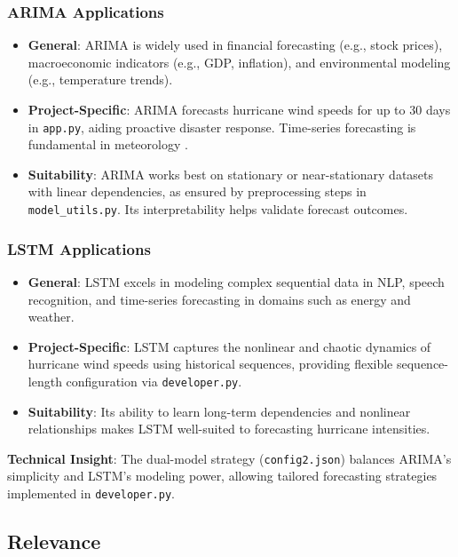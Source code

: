 \subsubsection{ARIMA Applications}

\begin{itemize}
	\item \textbf{General}: ARIMA is widely used in financial forecasting (e.g., stock prices), macroeconomic indicators (e.g., GDP, inflation), and environmental modeling (e.g., temperature trends).
	\item \textbf{Project-Specific}: ARIMA forecasts hurricane wind speeds for up to 30 days in \texttt{app.py}, aiding proactive disaster response. Time-series forecasting is fundamental in meteorology \cite{Emanuel2005}.
	\item \textbf{Suitability}: ARIMA works best on stationary or near-stationary datasets with linear dependencies, as ensured by preprocessing steps in \texttt{model\_utils.py}. Its interpretability helps validate forecast outcomes.
\end{itemize}

\subsubsection{LSTM Applications}

\begin{itemize}
	\item \textbf{General}: LSTM excels in modeling complex sequential data in NLP, speech recognition, and time-series forecasting in domains such as energy and weather.
	\item \textbf{Project-Specific}: LSTM captures the nonlinear and chaotic dynamics of hurricane wind speeds using historical sequences, providing flexible sequence-length configuration via \texttt{developer.py}.
	\item \textbf{Suitability}: Its ability to learn long-term dependencies and nonlinear relationships makes LSTM well-suited to forecasting hurricane intensities.
\end{itemize}

\textbf{Technical Insight}: The dual-model strategy (\texttt{config2.json}) balances ARIMA’s simplicity and LSTM’s modeling power, allowing tailored forecasting strategies implemented in \texttt{developer.py}.

\subsection{Relevance}

